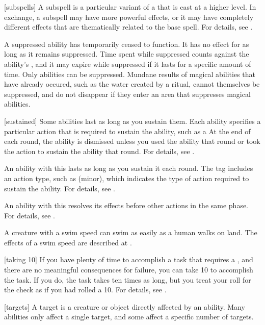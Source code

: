 [subspells] A subspell is a particular variant of a  that is cast at a higher level.
In exchange, a subspell may have more powerful effects, or it may have completely different effects that are thematically related to the base spell.
For details, see .

 A suppressed ability has temporarily ceased to function.
It has no effect for as long as it remains suppressed.
Time spent while suppressed counts against the ability's , and it may expire while suppressed if it lasts for a specific amount of time.
Only  abilities can be suppressed.
Mundane results of magical abilities that have already occured, such as the water created by a  ritual, cannot themselves be suppressed, and do not disappear if they enter an area that suppresses magical abilities.

[sustained] Some abilities last as long as you sustain them.
Each ability specifies a particular action that is required to sustain the ability, such as a 
At the end of each round, the ability is dismissed unless you used the ability that round or took the action to sustain the ability that round.
For details, see .

 An ability with this  lasts as long as you sustain it each round.
The tag includes an action type, such as (minor), which indicates the type of action required to sustain the ability.
For details, see .

 An ability with this  resolves its effects before other actions in the same phase.
For details, see .

 A creature with a swim speed can swim as easily as a human walks on land.
The effects of a swim speed are described at .

[taking 10] If you have plenty of time to accomplish a task that requires a , and there are no meaningful consequences for failure, you can take 10 to accomplish the task.
If you do, the task takes ten times as long, but you treat your roll for the check as if you had rolled a 10.
For details, see .

[targets] A target is a creature or object directly affected by an ability.
Many abilities only affect a single target, and some affect a specific number of targets.

